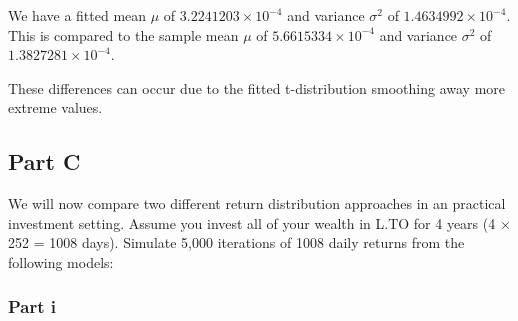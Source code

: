 \documentclass[
  oneside]{book}
\newenvironment{Shaded}{\begin{snugshade}}{\end{snugshade}}
\newcommand{\AttributeTok}[1]{\textcolor[rgb]{0.77,0.63,0.00}{#1}}
\newcommand{\CommentTok}[1]{\textcolor[rgb]{0.56,0.35,0.01}{\textit{#1}}}
\newcommand{\ControlFlowTok}[1]{\textcolor[rgb]{0.13,0.29,0.53}{\textbf{#1}}}
\newcommand{\DecValTok}[1]{\textcolor[rgb]{0.00,0.00,0.81}{#1}}
\newcommand{\FunctionTok}[1]{\textcolor[rgb]{0.00,0.00,0.00}{#1}}
\newcommand{\NormalTok}[1]{#1}
\newcommand{\OtherTok}[1]{\textcolor[rgb]{0.56,0.35,0.01}{#1}}
\newcommand{\SpecialCharTok}[1]{\textcolor[rgb]{0.00,0.00,0.00}{#1}}
\begin{document}
We have a fitted mean \(\mu\) of \ensuremath{3.2241203\times 10^{-4}} and variance \(\sigma^{2}\) of \ensuremath{1.4634992\times 10^{-4}}.
This is compared to the sample mean \(\mu\) of \ensuremath{5.6615334\times 10^{-4}} and variance \(\sigma^2\) of \ensuremath{1.3827281\times 10^{-4}}.

These differences can occur due to the fitted t-distribution smoothing away more extreme values.

\hypertarget{part-c-1}{%
\subsection{Part C}\label{part-c-1}}

We will now compare two different return distribution approaches in an practical investment setting. Assume you invest all of your wealth in L.TO for 4 years (4 × 252 = 1008 days). Simulate 5,000 iterations of 1008 daily returns from the following models:

\hypertarget{part-i}{%
\subsubsection{Part i}\label{part-i}}

\begin{Shaded}
\end{Shaded}
\end{document}
